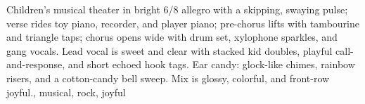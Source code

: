 
\begin{notes}
\end{notes}
\begin{prompt}
Children's musical theater in bright 6/8 allegro with a skipping, swaying pulse; verse rides toy piano, recorder, and player piano; pre-chorus lifts with tambourine and triangle taps; chorus opens wide with drum set, xylophone sparkles, and gang vocals. Lead vocal is sweet and clear with stacked kid doubles, playful call-and-response, and short echoed hook tags. Ear candy: glock-like chimes, rainbow risers, and a cotton-candy bell sweep. Mix is glossy, colorful, and front-row joyful., musical, rock, joyful
\end{prompt}

